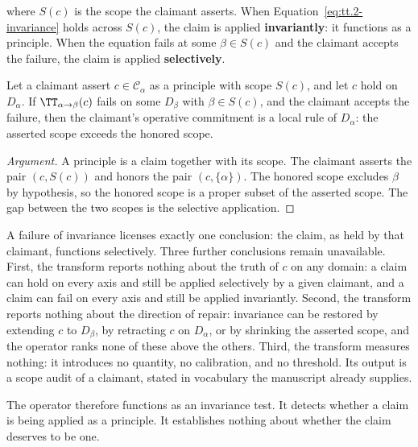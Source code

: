 where $S(c)$ is the scope the claimant asserts. When Equation~\ref{eq:tt.2-invariance} holds across
$S(c)$, the claim is applied \textbf{invariantly}: it functions as a principle. When the equation
fails at some $\beta \in S(c)$ and the claimant accepts the failure, the claim is applied
\textbf{selectively}.

\begin{theorem}
\label{thm:tt-selective}
Let a claimant assert $c \in \mathcal{C}_\alpha$ as a principle with scope $S(c)$, and let $c$
hold on $D_\alpha$. If $\TT_{\alpha \to \beta}(c)$ fails on some $D_\beta$ with
$\beta \in S(c)$, and the claimant accepts the failure, then the claimant's operative commitment
is a local rule of $D_\alpha$: the asserted scope exceeds the honored scope.
\end{theorem}

\begin{proof}[Argument]
A principle is a claim together with its scope. The claimant asserts the pair $(c, S(c))$ and
honors the pair $(c, \{\alpha\})$. The honored scope excludes $\beta$ by hypothesis, so the honored
scope is a proper subset of the asserted scope. The gap between the two scopes is the selective
application. \end{proof}

A failure of invariance licenses exactly one conclusion: the claim, as held by that claimant,
functions selectively. Three further conclusions remain unavailable. First, the transform reports
nothing about the truth of $c$ on any domain: a claim can hold on every axis and still be applied
selectively by a given claimant, and a claim can fail on every axis and still be applied
invariantly. Second, the transform reports nothing about the direction of repair: invariance can
be restored by extending $c$ to $D_\beta$, by retracting $c$ on $D_\alpha$, or by shrinking the
asserted scope, and the operator ranks none of these above the others. Third, the transform
measures nothing: it introduces no quantity, no calibration, and no threshold. Its output is a
scope audit of a claimant, stated in vocabulary the manuscript already supplies.

The operator therefore functions as an invariance test. It detects whether a claim is being
applied as a principle. It establishes nothing about whether the claim deserves to be one.

